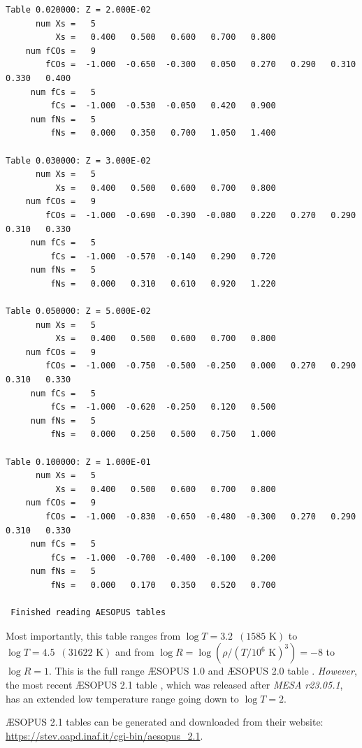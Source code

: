 \documentclass[a4paper,10pt]{article}
\begin{document}
\begin{verbatim}
Table 0.020000: Z = 2.000E-02
      num Xs =   5
          Xs =   0.400   0.500   0.600   0.700   0.800
    num fCOs =   9
        fCOs =  -1.000  -0.650  -0.300   0.050   0.270   0.290   0.310   0.330   0.400
     num fCs =   5
         fCs =  -1.000  -0.530  -0.050   0.420   0.900
     num fNs =   5
         fNs =   0.000   0.350   0.700   1.050   1.400

Table 0.030000: Z = 3.000E-02
      num Xs =   5
          Xs =   0.400   0.500   0.600   0.700   0.800
    num fCOs =   9
        fCOs =  -1.000  -0.690  -0.390  -0.080   0.220   0.270   0.290   0.310   0.330
     num fCs =   5
         fCs =  -1.000  -0.570  -0.140   0.290   0.720
     num fNs =   5
         fNs =   0.000   0.310   0.610   0.920   1.220

Table 0.050000: Z = 5.000E-02
      num Xs =   5
          Xs =   0.400   0.500   0.600   0.700   0.800
    num fCOs =   9
        fCOs =  -1.000  -0.750  -0.500  -0.250   0.000   0.270   0.290   0.310   0.330
     num fCs =   5
         fCs =  -1.000  -0.620  -0.250   0.120   0.500
     num fNs =   5
         fNs =   0.000   0.250   0.500   0.750   1.000

Table 0.100000: Z = 1.000E-01
      num Xs =   5
          Xs =   0.400   0.500   0.600   0.700   0.800
    num fCOs =   9
        fCOs =  -1.000  -0.830  -0.650  -0.480  -0.300   0.270   0.290   0.310   0.330
     num fCs =   5
         fCs =  -1.000  -0.700  -0.400  -0.100   0.200
     num fNs =   5
         fNs =   0.000   0.170   0.350   0.520   0.700

 Finished reading AESOPUS tables
\end{verbatim}
\nextpage
Most importantly, this table ranges from \(\log T = 3.2\,\,\, (1585 \text{ K})\) to \(\log T = 4.5\,\,\, (31622 \text{ K})\) and from \(\log R = \log (\rho / (T / 10^6 \text{ K})^3) = -8\) to \(\log R = 1\). This is the full range \AE SOPUS 1.0 \citep{marigo2009} and \AE SOPUS 2.0 table \citet{marigo2023}.
\emph{However}, the most recent \AE SOPUS 2.1 table \citep{marigo2024}, which was released after \emph{MESA r23.05.1}, has an extended low temperature range going down to \(\log T = 2\). 

\AE SOPUS 2.1 tables can be generated and downloaded from their website:
\url{https://stev.oapd.inaf.it/cgi-bin/aesopus_2.1}.
\end{document}
